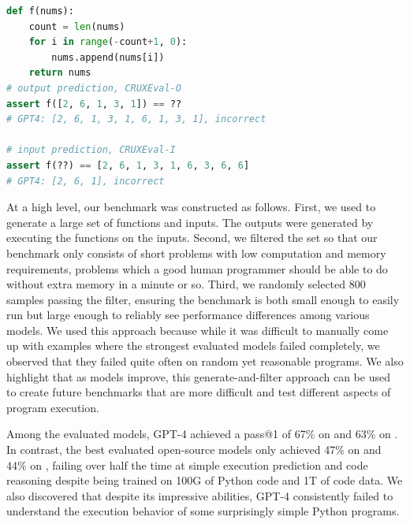 \begin{minipage}[t]{.48\textwidth}
\vspace{0pt}

\begin{lstlisting}[caption={Sample problem},label={lst:benchmark-example}, captionpos=t, breaklines=true, language=python, basicstyle=\ttfamily\scriptsize, breakindent=0pt, postbreak={}]
def f(nums):
    count = len(nums)
    for i in range(-count+1, 0):
        nums.append(nums[i])
    return nums
# output prediction, CRUXEval-O
assert f([2, 6, 1, 3, 1]) == ??
# GPT4: [2, 6, 1, 3, 1, 6, 1, 3, 1], incorrect

# input prediction, CRUXEval-I
assert f(??) == [2, 6, 1, 3, 1, 6, 3, 6, 6]
# GPT4: [2, 6, 1], incorrect
\end{lstlisting}
\end{minipage}

At a high level, our benchmark was constructed as follows. First, we used \codellamalarge to generate a large set of functions and inputs. The outputs were generated by executing the functions on the inputs. Second, we filtered the set so that our benchmark only consists of short problems with low computation and memory requirements, problems which a good human programmer should be able to do without extra memory in a minute or so. Third, we randomly selected 800 samples passing the filter, ensuring the benchmark is both small enough to easily run but large enough to reliably see performance differences among various models. We used this approach because while it was difficult to manually come up with examples where the strongest evaluated models failed completely, we observed that they failed quite often on random yet reasonable programs. We also highlight that as models improve, this generate-and-filter approach can be used to create future benchmarks that are more difficult and test different aspects of program execution.

Among the evaluated models, GPT-4 achieved a pass@1 of 67\% on \benchmarki and 63\% on \benchmarko. In contrast, the best evaluated open-source models only achieved 47\% on \benchmarki and 44\% on \benchmarko, failing over half the time at simple execution prediction and code reasoning despite being trained on 100G of Python code and 1T of code data. We also discovered that despite its impressive abilities, GPT-4 consistently failed to understand the execution behavior of some surprisingly simple Python programs.


%


